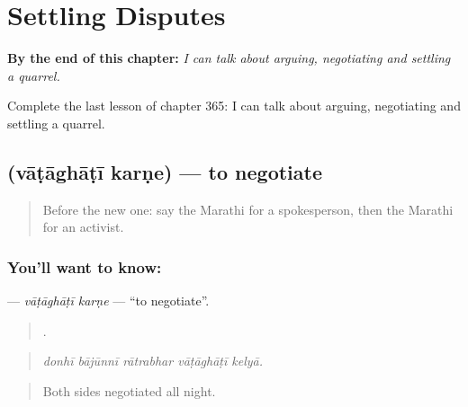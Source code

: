 
\chapter{Settling Disputes}
\label{ch:mr-settling-disputes}

\begin{chapteropening}
\textbf{By the end of this chapter:} \emph{I can talk about arguing, negotiating and settling a quarrel.}

Complete the last lesson of chapter 365: I can talk about arguing, negotiating and settling a quarrel.
\end{chapteropening}

\section[\texorpdfstring{\mr{वाटाघाटी} \mr{करणे} (vāṭāghāṭī karṇe)}{वाटाघाटी करणे (vāṭāghāṭī karṇe)}]{  (vāṭāghāṭī karṇe) — to negotiate}

\label{lesson:MR-C365-vataghati-karne}



\begin{quote}
Before the new one: say the Marathi for a spokesperson, then the Marathi for an activist.
\end{quote}

\subsection*{You'll want to know:  }
\textbf{ } — \emph{vāṭāghāṭī karṇe} — \textquotedblleft{}to negotiate\textquotedblright{}.

\begin{quote}
    .
\end{quote}

\begin{quote}
\emph{donhī bājūnnī rātrabhar vāṭāghāṭī kelyā.}
\end{quote}

\begin{quote}
Both sides negotiated all night.
\end{quote}

